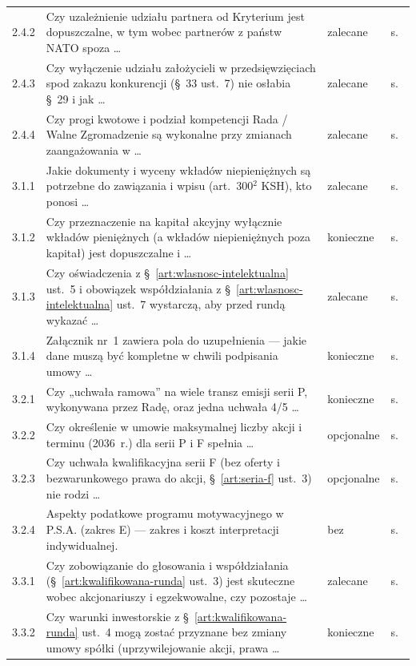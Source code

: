 \documentclass[12pt,a4paper]{report}
\begin{document}
{\begin{longtable}{@{}p{1.2cm} p{9.6cm} p{2.3cm} p{1.4cm}@{}}
2.4.2 & Czy uzależnienie udziału partnera od Kryterium jest dopuszczalne, w tym wobec partnerów z państw NATO spoza \ldots & zalecane & s.~\pageref{memo:2.4.2} \\
2.4.3 & Czy wyłączenie udziału założycieli w przedsięwzięciach spod zakazu konkurencji (§~33 ust.~7) nie osłabia §~29 i jak \ldots & zalecane & s.~\pageref{memo:2.4.3} \\
2.4.4 & Czy progi kwotowe i podział kompetencji Rada / Walne Zgromadzenie są wykonalne przy zmianach zaangażowania w \ldots & zalecane & s.~\pageref{memo:2.4.4} \\
3.1.1 & Jakie dokumenty i wyceny wkładów niepieniężnych są potrzebne do zawiązania i wpisu (art.~300$^{2}$ KSH), kto ponosi \ldots & zalecane & s.~\pageref{memo:3.1.1} \\
3.1.2 & Czy przeznaczenie na kapitał akcyjny wyłącznie wkładów pieniężnych (a wkładów niepieniężnych poza kapitał) jest dopuszczalne i \ldots & konieczne & s.~\pageref{memo:3.1.2} \\
3.1.3 & Czy oświadczenia z §~\ref{art:wlasnosc-intelektualna} ust.~5 i obowiązek współdziałania z §~\ref{art:wlasnosc-intelektualna} ust.~7 wystarczą, aby przed rundą wykazać \ldots & zalecane & s.~\pageref{memo:3.1.3} \\
3.1.4 & Załącznik nr~1 zawiera pola do uzupełnienia --- jakie dane muszą być kompletne w chwili podpisania umowy \ldots & konieczne & s.~\pageref{memo:3.1.4} \\
3.2.1 & Czy „uchwała ramowa” na wiele transz emisji serii P, wykonywana przez Radę, oraz jedna uchwała 4/5 \ldots & konieczne & s.~\pageref{memo:3.2.1} \\
3.2.2 & Czy określenie w umowie maksymalnej liczby akcji i terminu (2036~r.) dla serii P i F spełnia \ldots & opcjonalne & s.~\pageref{memo:3.2.2} \\
3.2.3 & Czy uchwała kwalifikacyjna serii F (bez oferty i bezwarunkowego prawa do akcji, §~\ref{art:seria-f} ust.~3) nie rodzi \ldots & opcjonalne & s.~\pageref{memo:3.2.3} \\
3.2.4 & Aspekty podatkowe programu motywacyjnego w P.S.A. (zakres E) --- zakres i koszt interpretacji indywidualnej. & bez & s.~\pageref{memo:3.2.4} \\
3.3.1 & Czy zobowiązanie do głosowania i współdziałania (§~\ref{art:kwalifikowana-runda} ust.~3) jest skuteczne wobec akcjonariuszy i egzekwowalne, czy pozostaje \ldots & zalecane & s.~\pageref{memo:3.3.1} \\
3.3.2 & Czy warunki inwestorskie z §~\ref{art:kwalifikowana-runda} ust.~4 mogą zostać przyznane bez zmiany umowy spółki (uprzywilejowanie akcji, prawa \ldots & konieczne & s.~\pageref{memo:3.3.2} \\

\end{longtable}}
\end{document}

